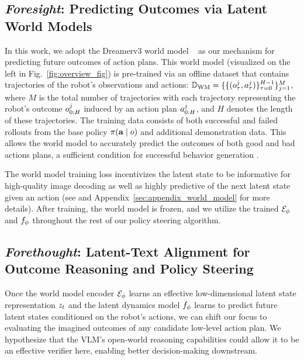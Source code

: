 \subsection{\textit{Foresight}: 
Predicting Outcomes via Latent World Models} 
\label{sec:foresight}


In this work, we adopt the Dreamerv3 world model ~\citep{hafner2023mastering} as our mechanism for predicting future outcomes of action plans. 
This world model (visualized on the left in Fig.~\ref{fig:overview_fig}) is pre-trained via an offline dataset that contains trajectories of the robot's observations and actions: $\mathbb{D}_{\text{WM}} = \{\{ (o_\tau^j, a_\tau^j)\}_{\tau=0}^{H-1}\}_{j=1}^M$, where $M$ is the total number of trajectories with each trajectory representing the robot's outcome $o_{0:H}^j$ induced by an action plan $a_{0:H}^j$, and $H$ denotes the length of these trajectories. 
The training data consists of both successful and failed rollouts from the base policy $\pi(\mathbf{a} \mid o)$ and additional demonstration data. This allows the world model to accurately predict the outcomes of both good and bad actions plans, a sufficient condition for successful behavior generation \citep{ren2024hybrid}.


The world model training loss incentivizes the latent state to be informative for high-quality image decoding as well as highly predictive of the next latent state given an action (see \cite{hafner2023mastering} and Appendix~\ref{sec:appendix_world_model} for more details). 
After training, the world model is frozen, and we utilize the trained $\mathcal{E}_\phi$ and $f_\phi$ throughout the rest of our policy steering algorithm. 


\subsection{\textit{Forethought}: Latent-Text Alignment for Outcome Reasoning and Policy Steering}
\label{sec:forethought}

Once the world model encoder $\mathcal{E}_\phi$ learns an effective low-dimensional latent state representation $z_t$ and the latent dynamics model $f_\phi$ learns to predict future latent states conditioned on the robot’s actions, we can shift our focus to evaluating the imagined outcomes of any candidate low-level action plan. 
We hypothesize that the VLM’s open-world reasoning capabilities could allow it to be an effective verifier here, enabling better decision-making downstream.

